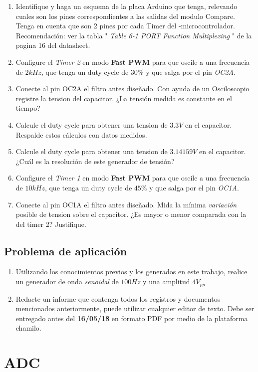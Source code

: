 \documentclass[10pt,conference,a4paper,onecolumn]{article}%
\begin{document}
\begin{enumerate}
\item Identifique y haga un esquema de la placa Arduino que tenga, relevando cuales son los pines correspondientes a las salidas del modulo Compare. Tenga en cuenta que son 2 pines por cada Timer del -microcontrolador. Recomendación: ver la  tabla " \emph{Table 6-1 PORT Function Multiplexing} " de la pagina 16 del datasheet.
 \item Configure el \emph{Timer 2} en modo \textbf{Fast PWM} para que oscile a una frecuencia de \emph{$2kHz$}, que tenga un duty cycle de \emph{ $ 30 \% $ } y que salga por el pin \emph{OC2A}.
 \item Conecte al pin OC2A el filtro antes diseñado. Con ayuda de un Osciloscopio registre la tension del capacitor. ¿La tensión medida es constante en el tiempo?
 \item Calcule el  duty cycle para  obtener una tension de $ 3.3V $ en el capacitor. Respalde estos cálculos con datos medidos. 
\item  Calcule el  duty cycle para  obtener una tension de $ 3.14159V $ en el capacitor. ¿Cuál es la resolución de este generador de tensión?
 \item Configure el \emph{Timer 1} en modo \textbf{Fast PWM} para que oscile a una frecuencia de \emph{$10kHz$}, que tenga un duty cycle de \emph{ $ 45 \% $ } y que salga por el pin \emph{OC1A}.
 \item Conecte al pin OC1A el filtro antes diseñado. Mida la mínima \emph{variación} posible de tension sobre el capacitor. ¿Es mayor o menor comparada con la del timer 2? Justifique.

\end{enumerate}
 
\subsection{Problema de aplicación}
\begin{enumerate}
\item Utilizando los conocimientos previos y los generados en este trabajo, realice un generador de onda \emph{senoidal} de $100Hz$ y una amplitud $4V_{pp} $ 
 \item Redacte un informe que contenga todos los registros y documentos  mencionados anteriormente, puede utilizar cualquier editor de texto. Debe ser entregado antes del \textbf{16/05/18} en formato PDF por medio de la plataforma chamilo. 
\end{enumerate}

\section{ADC}
\end{document}

